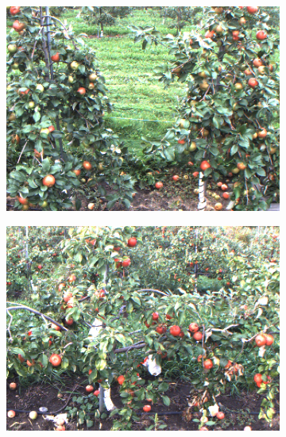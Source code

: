 \begin{figure}[!hbpt]
        \centering
        \begin{subfigure}[b]{.20\textwidth}
            \includegraphics[width =\textwidth]{figures/counting/dataset1.jpg}           
       \end{subfigure}\quad \begin{subfigure}[b]{.20\textwidth}
            \includegraphics[width = \textwidth]{figures/counting//dataset2.jpg}           
        \end{subfigure}\quad \begin{subfigure}[b]{.22\textwidth}

\end{subfigure}
\end{figure}

